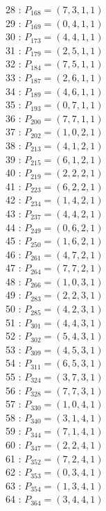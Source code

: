 \documentclass{article}
\begin{document}
{\begin{multicols}{3}
28 : $P_{168}=( 7, 3, 1, 1 )$\\
29 : $P_{169}=( 0, 4, 1, 1 )$\\
30 : $P_{173}=( 4, 4, 1, 1 )$\\
31 : $P_{179}=( 2, 5, 1, 1 )$\\
32 : $P_{184}=( 7, 5, 1, 1 )$\\
33 : $P_{187}=( 2, 6, 1, 1 )$\\
34 : $P_{189}=( 4, 6, 1, 1 )$\\
35 : $P_{193}=( 0, 7, 1, 1 )$\\
36 : $P_{200}=( 7, 7, 1, 1 )$\\
37 : $P_{202}=( 1, 0, 2, 1 )$\\
38 : $P_{213}=( 4, 1, 2, 1 )$\\
39 : $P_{215}=( 6, 1, 2, 1 )$\\
40 : $P_{219}=( 2, 2, 2, 1 )$\\
41 : $P_{223}=( 6, 2, 2, 1 )$\\
42 : $P_{234}=( 1, 4, 2, 1 )$\\
43 : $P_{237}=( 4, 4, 2, 1 )$\\
44 : $P_{249}=( 0, 6, 2, 1 )$\\
45 : $P_{250}=( 1, 6, 2, 1 )$\\
46 : $P_{261}=( 4, 7, 2, 1 )$\\
47 : $P_{264}=( 7, 7, 2, 1 )$\\
48 : $P_{266}=( 1, 0, 3, 1 )$\\
49 : $P_{283}=( 2, 2, 3, 1 )$\\
50 : $P_{285}=( 4, 2, 3, 1 )$\\
51 : $P_{301}=( 4, 4, 3, 1 )$\\
52 : $P_{302}=( 5, 4, 3, 1 )$\\
53 : $P_{309}=( 4, 5, 3, 1 )$\\
54 : $P_{311}=( 6, 5, 3, 1 )$\\
55 : $P_{324}=( 3, 7, 3, 1 )$\\
56 : $P_{328}=( 7, 7, 3, 1 )$\\
57 : $P_{330}=( 1, 0, 4, 1 )$\\
58 : $P_{340}=( 3, 1, 4, 1 )$\\
59 : $P_{344}=( 7, 1, 4, 1 )$\\
60 : $P_{347}=( 2, 2, 4, 1 )$\\
61 : $P_{352}=( 7, 2, 4, 1 )$\\
62 : $P_{353}=( 0, 3, 4, 1 )$\\
63 : $P_{354}=( 1, 3, 4, 1 )$\\
64 : $P_{364}=( 3, 4, 4, 1 )$\\

\end{multicols}}
\end{document}
